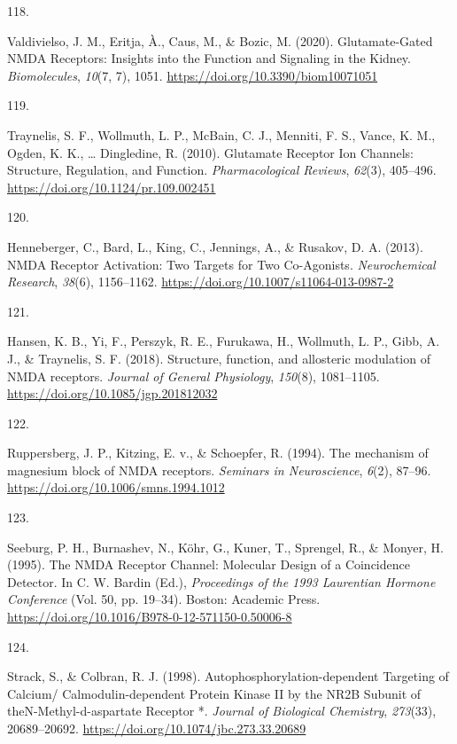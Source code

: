 \documentclass[
  11pt,
  letterpaper,
]{scrreprt}
\newlength{\cslhangindent}
\newlength{\csllabelwidth}
\newenvironment{CSLReferences}[2] %
 {\begin{list}{}{%
  \setlength{\itemindent}{0pt}
  \setlength{\leftmargin}{0pt}
  \setlength{\parsep}{0pt}
  \ifodd #1
   \setlength{\leftmargin}{\cslhangindent}
   \setlength{\itemindent}{-1\cslhangindent}
  \fi
  \setlength{\itemsep}{#2\baselineskip}}}
 {\end{list}}
\newcommand{\CSLLeftMargin}[1]{\parbox[t]{\csllabelwidth}{\strut#1\strut}}
\newcommand{\CSLRightInline}[1]{\parbox[t]{\linewidth - \csllabelwidth}{\strut#1\strut}}
\begin{document}
\begin{CSLReferences}{0}{0}
\CSLLeftMargin{118. }%
\CSLRightInline{Valdivielso, J. M., Eritja, À., Caus, M., \& Bozic, M.
(2020). Glutamate-{Gated NMDA Receptors}: {Insights} into the {Function}
and {Signaling} in the {Kidney}. \emph{Biomolecules}, \emph{10}(7, 7),
1051. \url{https://doi.org/10.3390/biom10071051}}

\CSLLeftMargin{119. }%
\CSLRightInline{Traynelis, S. F., Wollmuth, L. P., McBain, C. J.,
Menniti, F. S., Vance, K. M., Ogden, K. K., \ldots{} Dingledine, R.
(2010). Glutamate {Receptor Ion Channels}: {Structure}, {Regulation},
and {Function}. \emph{Pharmacological Reviews}, \emph{62}(3), 405--496.
\url{https://doi.org/10.1124/pr.109.002451}}

\CSLLeftMargin{120. }%
\CSLRightInline{Henneberger, C., Bard, L., King, C., Jennings, A., \&
Rusakov, D. A. (2013). {NMDA Receptor Activation}: {Two Targets} for
{Two Co-Agonists}. \emph{Neurochemical Research}, \emph{38}(6),
1156--1162. \url{https://doi.org/10.1007/s11064-013-0987-2}}

\CSLLeftMargin{121. }%
\CSLRightInline{Hansen, K. B., Yi, F., Perszyk, R. E., Furukawa, H.,
Wollmuth, L. P., Gibb, A. J., \& Traynelis, S. F. (2018). Structure,
function, and allosteric modulation of {NMDA} receptors. \emph{Journal
of General Physiology}, \emph{150}(8), 1081--1105.
\url{https://doi.org/10.1085/jgp.201812032}}

\CSLLeftMargin{122. }%
\CSLRightInline{Ruppersberg, J. P., Kitzing, E. v., \& Schoepfer, R.
(1994). The mechanism of magnesium block of {NMDA} receptors.
\emph{Seminars in Neuroscience}, \emph{6}(2), 87--96.
\url{https://doi.org/10.1006/smns.1994.1012}}

\CSLLeftMargin{123. }%
\CSLRightInline{Seeburg, P. H., Burnashev, N., Köhr, G., Kuner, T.,
Sprengel, R., \& Monyer, H. (1995). The {NMDA Receptor Channel}:
{Molecular Design} of a {Coincidence Detector}. In C. W. Bardin (Ed.),
\emph{Proceedings of the 1993 {Laurentian Hormone Conference}} (Vol. 50,
pp. 19--34). Boston: Academic Press.
\url{https://doi.org/10.1016/B978-0-12-571150-0.50006-8}}

\CSLLeftMargin{124. }%
\CSLRightInline{Strack, S., \& Colbran, R. J. (1998).
Autophosphorylation-dependent {Targeting} of {Calcium}/
{Calmodulin-dependent Protein Kinase II} by the {NR2B Subunit} of
{theN-Methyl-d-aspartate Receptor} *. \emph{Journal of Biological
Chemistry}, \emph{273}(33), 20689--20692.
\url{https://doi.org/10.1074/jbc.273.33.20689}}


\end{CSLReferences}
\end{document}
